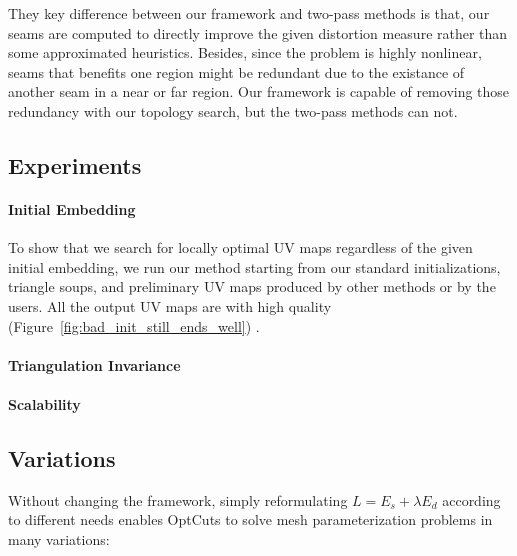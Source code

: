 
They key difference between our framework and two-pass methods is that, our seams are computed to directly improve the given distortion measure rather than some approximated heuristics. Besides, since the problem is highly nonlinear, seams that benefits one region might be redundant due to the existance of another seam in a near or far region. Our framework is capable of removing those redundancy with our topology search, but the two-pass methods can not.


\subsection{Experiments}
\label{sec:results_exp}

\paragraph{Initial Embedding}
To show that we search for locally optimal UV maps regardless of the given initial embedding, we run our method starting from our standard initializations, triangle soups, and preliminary UV maps produced by other methods or by the users. All the output UV maps are with high quality (Figure~\ref{fig:bad_init_still_ends_well}) \minchen{[TODO]}.

\paragraph{Triangulation Invariance} 

\paragraph{Scalability} \minchen{[TODO]}

\subsection{Variations}
\label{sec:results_variations}

Without changing the framework, simply reformulating $L = E_s + \lambda E_d$ according to different needs enables OptCuts to solve mesh parameterization problems in many variations:

